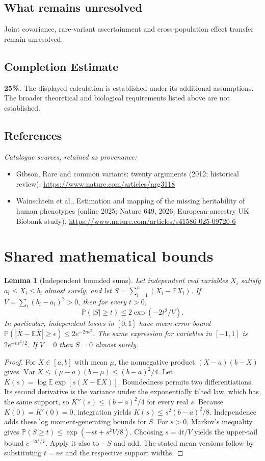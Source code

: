 \documentclass[11pt]{article}
\newcommand{\E}{\mathbb E}
\newcommand{\Prob}{\mathbb P}
\DeclareMathOperator{\Var}{Var}
\providecommand{\E}{\mathbb E}
\providecommand{\Prob}{\mathbb P}
\providecommand{\Var}{\operatorname{Var}}
\newtheorem{sharedlemma}{Lemma}[section]
\begin{document}
\subsection{What remains unresolved}
Joint covariance, rare-variant ascertainment and cross-population effect transfer remain unresolved.
\subsection{Completion Estimate}
\textbf{25\%.} The displayed calculation is established under its additional assumptions. The broader theoretical and biological requirements listed above are not established.
\subsection{References}
\noindent\emph{Catalogue sources, retained as provenance:}
\begin{itemize}
\item Gibson, Rare and common variants: twenty arguments (2012; historical review). \url{https://www.nature.com/articles/nrg3118}
\item Wainschtein et al., Estimation and mapping of the missing heritability of human phenotypes (online 2025; Nature 649, 2026; European-ancestry UK Biobank study). \url{https://www.nature.com/articles/s41586-025-09720-6}
\end{itemize}
\clearpage


\appendix
\section{Shared mathematical bounds}\label{app:bounds}
\begin{sharedlemma}[Independent bounded sums]\label{lem:bounded}
Let independent real variables $X_i$ satisfy $a_i\leq X_i\leq b_i$ almost surely,
and let $S=\sum_{i=1}^n(X_i-\E X_i)$. If
$V=\sum_i(b_i-a_i)^2>0$, then for every $t>0$,
\[
 \Prob(|S|\geq t)\leq 2\exp(-2t^2/V).
\]
In particular, independent losses in $[0,1]$ have mean-error bound
$\Prob(|\overline X-\E\overline X|\geq\epsilon)
\leq2e^{-2n\epsilon^2}$. The same expression for variables in $[-1,1]$
is $2e^{-n\epsilon^2/2}$. If $V=0$ then $S=0$ almost surely.
\end{sharedlemma}
\begin{proof}
For $X\in[a,b]$ with mean $\mu$, the nonnegative product
$(X-a)(b-X)$ gives
$\Var X\leq(\mu-a)(b-\mu)\leq(b-a)^2/4$.
Let $K(s)=\log\E\exp[s(X-\E X)]$.
Boundedness permits two differentiations. Its second derivative is the variance
under the exponentially tilted law, which has the same support, so
$K''(s)\leq(b-a)^2/4$ for every real $s$.
Because $K(0)=K'(0)=0$, integration yields
$K(s)\leq s^2(b-a)^2/8$.
Independence adds these log moment-generating bounds for $S$.
For $s>0$, Markov's inequality gives
$\Prob(S\geq t)\leq\exp(-st+s^2V/8)$.
Choosing $s=4t/V$ yields the upper-tail bound $e^{-2t^2/V}$.
Apply it also to $-S$ and add. The stated mean versions follow by substituting
$t=n\epsilon$ and the respective support widths.
\end{proof}
\end{document}
